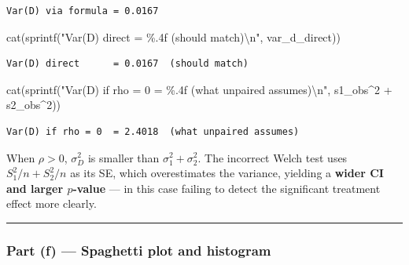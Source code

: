 \documentclass[
  letterpaper,
  DIV=11,
  numbers=noendperiod]{scrartcl}
\newenvironment{Shaded}{\begin{snugshade}}{\end{snugshade}}
\newcommand{\DecValTok}[1]{\textcolor[rgb]{0.68,0.00,0.00}{#1}}
\newcommand{\FunctionTok}[1]{\textcolor[rgb]{0.28,0.35,0.67}{#1}}
\newcommand{\NormalTok}[1]{\textcolor[rgb]{0.00,0.23,0.31}{#1}}
\newcommand{\SpecialCharTok}[1]{\textcolor[rgb]{0.37,0.37,0.37}{#1}}
\newcommand{\StringTok}[1]{\textcolor[rgb]{0.13,0.47,0.30}{#1}}
\begin{document}
\begin{verbatim}
Var(D) via formula = 0.0167
\end{verbatim}

\begin{Shaded}
\begin{Highlighting}[]
\FunctionTok{cat}\NormalTok{(}\FunctionTok{sprintf}\NormalTok{(}\StringTok{"Var(D) direct      = \%.4f  (should match)}\SpecialCharTok{\textbackslash{}n}\StringTok{"}\NormalTok{, var\_d\_direct))}
\end{Highlighting}
\end{Shaded}

\begin{verbatim}
Var(D) direct      = 0.0167  (should match)
\end{verbatim}

\begin{Shaded}
\begin{Highlighting}[]
\FunctionTok{cat}\NormalTok{(}\FunctionTok{sprintf}\NormalTok{(}\StringTok{"Var(D) if rho = 0  = \%.4f  (what unpaired assumes)}\SpecialCharTok{\textbackslash{}n}\StringTok{"}\NormalTok{,}
\NormalTok{            s1\_obs}\SpecialCharTok{\^{}}\DecValTok{2} \SpecialCharTok{+}\NormalTok{ s2\_obs}\SpecialCharTok{\^{}}\DecValTok{2}\NormalTok{))}
\end{Highlighting}
\end{Shaded}

\begin{verbatim}
Var(D) if rho = 0  = 2.4018  (what unpaired assumes)
\end{verbatim}

When \(\rho > 0\), \(\sigma_D^2\) is smaller than
\(\sigma_1^2 + \sigma_2^2\). The incorrect Welch test uses
\(S_1^2/n + S_2^2/n\) as its SE, which overestimates the variance,
yielding a \textbf{wider CI and larger \(p\)-value} --- in this case
failing to detect the significant treatment effect more clearly.

\begin{center}\rule{0.5\linewidth}{0.5pt}\end{center}

\subsubsection{Part (f) --- Spaghetti plot and
histogram}\label{part-f-spaghetti-plot-and-histogram}
\end{document}
